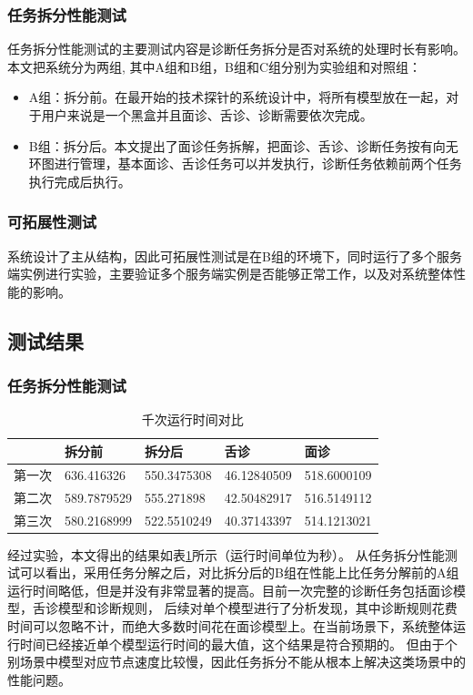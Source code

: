 \subsubsection{任务拆分性能测试}
任务拆分性能测试的主要测试内容是诊断任务拆分是否对系统的处理时长有影响。
本文把系统分为两组, 其中A组和B组，B组和C组分别为实验组和对照组：
\begin{itemize}
    \item A组：拆分前。在最开始的技术探针的系统设计中，将所有模型放在一起，对于用户来说是一个黑盒并且面诊、舌诊、诊断需要依次完成。
    \item B组：拆分后。本文提出了面诊任务拆解，把面诊、舌诊、诊断任务按有向无环图进行管理，基本面诊、舌诊任务可以并发执行，诊断任务依赖前两个任务执行完成后执行。
\end{itemize}

\subsubsection{可拓展性测试}
系统设计了主从结构，因此可拓展性测试是在B组的环境下，同时运行了多个服务端实例进行实验，主要验证多个服务端实例是否能够正常工作，以及对系统整体性能的影响。


\subsection{测试结果}

\subsubsection{任务拆分性能测试}


\begin{table}[h!]
    \centering
    \caption{千次运行时间对比}
    \begin{tabular}{l|l|l|l|l}
        &拆分前&拆分后&舌诊&面诊 \\
        \hline
        第一次&636.416326&550.3475308&46.12840509&518.6000109 \\
        第二次&589.7879529&555.271898&42.50482917&516.5149112 \\
        第三次&580.2168999&522.5510249&40.37143397&514.1213021 \\
    \end{tabular}
    \label{tab:runtime}
\end{table}

经过实验，本文得出的结果如表\ref{tab:runtime}所示（运行时间单位为秒）。
从任务拆分性能测试可以看出，采用任务分解之后，对比拆分后的B组在性能上比任务分解前的A组运行时间略低，但是并没有非常显著的提高。目前一次完整的诊断任务包括面诊模型，舌诊模型和诊断规则，
后续对单个模型进行了分析发现，其中诊断规则花费时间可以忽略不计，而绝大多数时间花在面诊模型上。在当前场景下，系统整体运行时间已经接近单个模型运行时间的最大值，这个结果是符合预期的。
但由于个别场景中模型对应节点速度比较慢，因此任务拆分不能从根本上解决这类场景中的性能问题。

